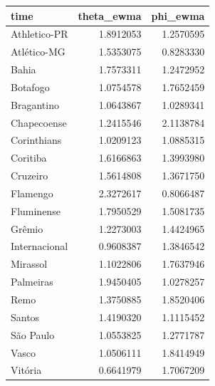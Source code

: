 \documentclass[11pt,]{article}
\begin{document}
\begin{longtable}[]{@{}lrr@{}}
\toprule\noalign{}
time & theta\_ewma & phi\_ewma \\
\midrule\noalign{}
\endhead
\bottomrule\noalign{}
\endlastfoot
Athletico-PR & 1.8912053 & 1.2570595 \\
Atlético-MG & 1.5353075 & 0.8283330 \\
Bahia & 1.7573311 & 1.2472952 \\
Botafogo & 1.0754578 & 1.7652459 \\
Bragantino & 1.0643867 & 1.0289341 \\
Chapecoense & 1.2415546 & 2.1138784 \\
Corinthians & 1.0209123 & 1.0885315 \\
Coritiba & 1.6166863 & 1.3993980 \\
Cruzeiro & 1.5614808 & 1.3671750 \\
Flamengo & 2.3272617 & 0.8066487 \\
Fluminense & 1.7950529 & 1.5081735 \\
Grêmio & 1.2273003 & 1.4424965 \\
Internacional & 0.9608387 & 1.3846542 \\
Mirassol & 1.1022806 & 1.7637946 \\
Palmeiras & 1.9450405 & 1.0278257 \\
Remo & 1.3750885 & 1.8520406 \\
Santos & 1.4190320 & 1.1115452 \\
São Paulo & 1.0553825 & 1.2771787 \\
Vasco & 1.0506111 & 1.8414949 \\
Vitória & 0.6641979 & 1.7067209 \\
\end{longtable}
\end{document}

